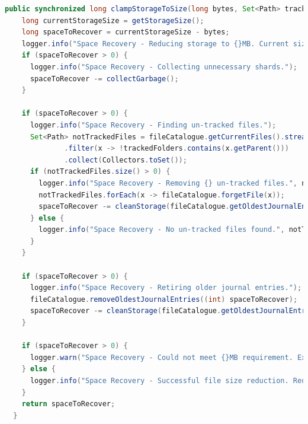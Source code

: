 \documentclass[11pt, a4paper, twocolumn, twoside]{report}
\begin{document}
\begin{lstlisting}[language=Java, caption=Storage Clamping Implementation, label=lst:storageClamping]
  public synchronized long clampStorageToSize(long bytes, Set<Path> trackedFolders) throws StorageManagerException {
    long currentStorageSize = getStorageSize();
    long spaceToRecover = currentStorageSize - bytes;
    logger.info("Space Recovery - Reducing storage to {}MB. Current size {}MB. Need to remove {}MB", ((float) bytes) / (1024 * 1024), ((float) currentStorageSize) / (1024 * 1024), ((float) Math.max(spaceToRecover, 0)) / (1024 * 1024));
    if (spaceToRecover > 0) {
      logger.info("Space Recovery - Collecting unnecessary shards.");
      spaceToRecover -= collectGarbage();
    }

    if (spaceToRecover > 0) {
      logger.info("Space Recovery - Finding un-tracked files.");
      Set<Path> notTrackedFiles = fileCatalogue.getCurrentFiles().stream()
              .filter(x -> !trackedFolders.contains(x.getParent()))
              .collect(Collectors.toSet());
      if (notTrackedFiles.size() > 0) {
        logger.info("Space Recovery - Removing {} un-tracked files.", notTrackedFiles.size());
        notTrackedFiles.forEach(x -> fileCatalogue.forgetFile(x));
        spaceToRecover -= cleanStorage(fileCatalogue.getOldestJournalEntryTime());
      } else {
        logger.info("Space Recovery - No un-tracked files found.", notTrackedFiles.size());
      }
    }

    if (spaceToRecover > 0) {
      logger.info("Space Recovery - Retiring older journal entries.");
      fileCatalogue.removeOldestJournalEntries((int) spaceToRecover);
      spaceToRecover -= cleanStorage(fileCatalogue.getOldestJournalEntryTime());
    }

    if (spaceToRecover > 0) {
      logger.warn("Space Recovery - Could not meet {}MB requirement. Excess is {}MB.", ((float) bytes) / (1024 * 1024), ((float) spaceToRecover) / (1024 * 1024));
    } else {
      logger.info("Space Recovery - Successful file size reduction. Reduced to {}MB.", ((float) (bytes + spaceToRecover)) / (1024 * 1024));
    }
    return spaceToRecover;
  }
\end{lstlisting}
\end{document}
